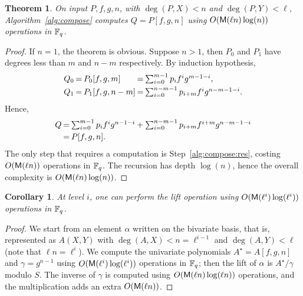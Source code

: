 \documentclass{sig-alternate}
\newtheorem{theorem}[definition]{Theorem}
\newtheorem{corollary}[definition]{Corollary}
\begin{document}
\begin{theorem}
  \label{th:compose}
  On input $P,f,g,n$, with $\deg(P,X)<n$ and $\deg(P,Y) < \ell$,
  Algorithm~\ref{alg:compose} computes $Q=P[f,g,n]$ using $O(\mathsf{M}(\ell
  n)\log(n))$ operations in $\mathbb{F}_q$.
\end{theorem}
\begin{proof}
  If $n=1$, the theorem is obvious. Suppose $n>1$, then $P_0$ and
  $P_1$ have degrees less than $m$ and $n-m$ respectively. By
  induction hypothesis,
  \begin{equation*}
    \setlength{\arraycolsep}{1pt}
    \begin{array}{lllll}
      Q_0 & = & P_0[f,g,m] & = & \sum_{i=0}^{m-1}p_if^ig^{m-1-i},\vspace*{1mm}\\
      Q_1 & = & P_1[f,g,n-m] & = & \sum_{i=0}^{n-m-1}p_{i+m}f^ig^{n-m-1-i}.   
    \end{array}
  \end{equation*}
  Hence,
  \[
  \setlength{\arraycolsep}{1pt}
  \begin{array}{lll}
    Q & = & \sum_{i=0}^{m-1}p_if^ig^{n-1-i} +
    \sum_{i=0}^{n-m-1}p_{i+m}f^{i+m}g^{n-m-1-i}\vspace*{1mm}\\
    & = & P[f,g,n].
  \end{array}
  \]
  The only step that requires a computation is
  Step~\ref{alg:compose:res}, costing $O(\mathsf{M}(\ell n))$ operations in
  $\mathbb{F}_q$. The recursion has depth $\log(n)$, hence the overall
  complexity is $O(\mathsf{M}(\ell n)\log(n))$.
\end{proof}

\begin{corollary}
  At level $i$, one can perform the lift operation using
  $O(\mathsf{M}(\ell^i)\log(\ell^i))$ operations in $\mathbb{F}_q$.
\end{corollary}
\begin{proof}
  We start from an element $\alpha$ written on the bivariate basis, that
  is, represented as $A(X,Y)$ with $\deg(A,X)<n=\ell^{i-1}$ and
  $\deg(A,Y)<\ell$ (note that $\ell n =\ell^i$).  We compute the
  univariate polynomials $A^\star=A[f,g,n]$ and $\gamma=g^{n-1}$ using
  $O(\mathsf{M}(\ell^i)\log(\ell^i))$ operations in $\mathbb{F}_q$; then the lift
  of $\alpha$ is $A^\star/\gamma$ modulo $S$. The inverse of $\gamma$
  is computed using $O(\mathsf{M}(\ell n)\log(\ell n))$ operations, and the
  multiplication adds an extra $O(\mathsf{M}(\ell n))$.
\end{proof}
\end{document}
